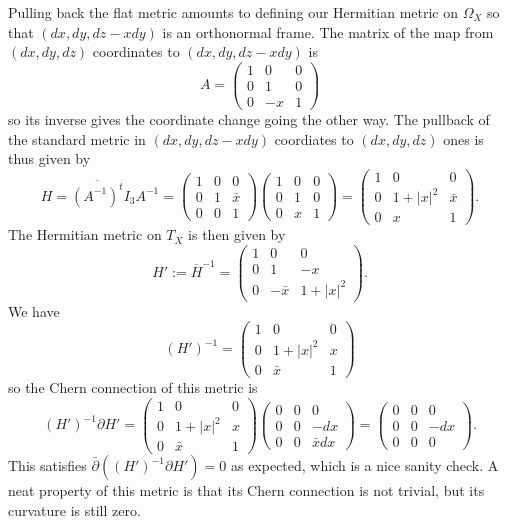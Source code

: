 \documentclass[11pt]{article}
\begin{document}
Pulling back the flat metric amounts to defining our Hermitian metric on $\Omega_X$ so that $(dx, dy, dz - xdy)$ is an orthonormal frame. The matrix of the map from $(dx, dy, dz)$ coordinates to $(dx, dy, dz - xdy)$ is
$$
A = \begin{pmatrix}
1 & 0 & 0 \\
0 & 1 & 0 \\
0 & -x & 1
\end{pmatrix}
$$
so its inverse gives the coordinate change going the other way. The pullback of the standard metric in $(dx, dy, dz-x dy)$ coordiates to $(dx, dy, dz)$ ones is thus given by
$$
H = \overline{(A^{-1})^t} I_3 A^{-1}
=
\begin{pmatrix}
1 & 0 & 0 \\
0 & 1 & \bar x \\
0 & 0 & 1
\end{pmatrix}
\begin{pmatrix}
1 & 0 & 0 \\
0 & 1 & 0 \\
0 & x & 1
\end{pmatrix}
=
\begin{pmatrix}
1 & 0 & 0 \\
0 & 1+|x|^2 & \bar x \\
0 & x & 1
\end{pmatrix}.
$$
The Hermitian metric on $T_X$ is then given by
$$
H' := \overline{H}^{-1}
= \begin{pmatrix}
1 & 0 & 0 \\
0 & 1 & - x \\
0 & -\bar x & 1+|x|^2
\end{pmatrix}.
$$
We have
$$
(H')^{-1} = \begin{pmatrix}
  1 & 0 & 0 \\
  0 & 1 + |x|^2 & x \\
  0 & \bar x & 1
\end{pmatrix}
$$
so the Chern connection of this metric is
$$
(H')^{-1} \partial H'
= \begin{pmatrix}
  1 & 0 & 0 \\
  0 & 1 + |x|^2 & x \\
  0 & \bar x & 1
\end{pmatrix}
\begin{pmatrix}
0 & 0 & 0 \\
0 & 0 & -dx \\
0 & 0 & \bar x dx
\end{pmatrix}
= \begin{pmatrix}
0 & 0 & 0 \\
0 & 0 & -dx \\
0 & 0 & 0
\end{pmatrix}.
$$
This satisfies $\bar\partial((H')^{-1} \partial H') = 0$ as expected, which is a nice sanity check. A neat property of this metric is that its Chern connection is not trivial, but its curvature is still zero.
\end{document}
